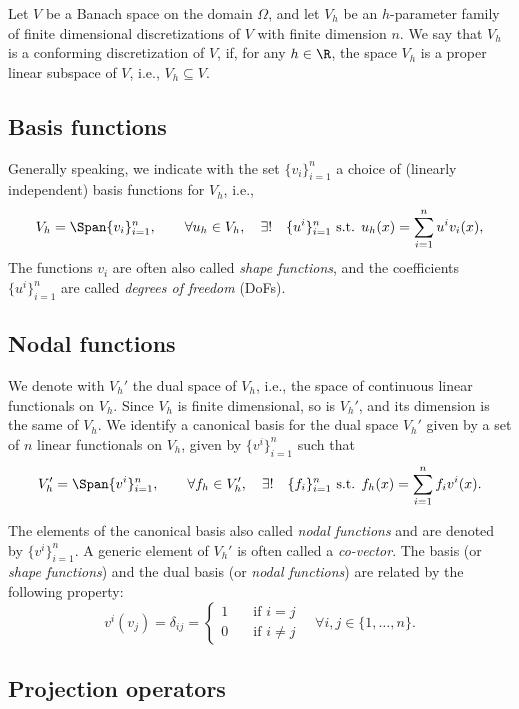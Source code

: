 Let $V$ be a Banach space on the domain $\Omega$, and let $V_h$ be an $h$-parameter family of finite dimensional discretizations of $V$ with finite dimension $n$. We say that $V_h$ is a conforming discretization of $V$, if, for any $h\in \R$, the space $V_h$ is a proper linear subspace of $V$, i.e., $V_h \subseteq V$. 

\subsection{Basis functions}

Generally speaking, we indicate with the set $\{v_i\}_{i=1}^n$ a choice of (linearly independent) basis functions for $V_h$, i.e., 
\[
V_h = \Span\{v_i\}_{i=1}^n, \qquad \forall u_h \in V_h , \quad \exists! \quad \{u^i\}_{i=1}^n \text{ s.t. } u_h(x) = \sum_{i=1}^n u^i v_i(x),
\]
The functions $v_i$ are often also called \emph{shape functions}, and the coefficients $\{u^i\}_{i=1}^n$ are called \emph{degrees of freedom} (DoFs).

\subsection{Nodal functions}

We denote with $V_h'$ the dual space of $V_h$, i.e., the space of continuous linear functionals on $V_h$. Since $V_h$ is finite dimensional, so is $V_h'$, and its dimension is the same of $V_h$. We identify a canonical basis for the dual space $V_h'$ given by a set of $n$ linear functionals on $V_h$, given by $\{v^i\}_{i=1}^n$ such that 
\[
V_h' = \Span\{v^i\}_{i=1}^n, \qquad \forall f_h \in V_h', \quad \exists! \quad \{f_i\}_{i=1}^n \text{ s.t. } f_h(x) = \sum_{i=1}^n f_i v^i(x).
\]

The elements of the canonical basis also called \emph{nodal functions} and are
denoted by $\{v^i\}_{i=1}^n$. A generic element of $V_h'$ is often called a
\emph{co-vector}. The basis (or \emph{shape functions}) and the dual basis (or
\emph{nodal functions}) are related by the following property:
\[
v^i(v_j) = \delta_{ij} = \begin{cases}
1 \quad &\text{if } i=j \\
0 \quad &\text{if } i\ne j
\end{cases}
\quad \forall i,j \in \{1,\dots,n\}.
\]

\subsection{Projection operators}

